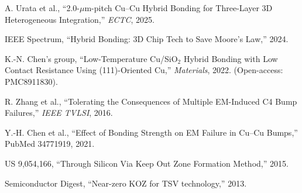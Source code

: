 \documentclass[conference]{IEEEtran}
\begin{document}
\begin{thebibliography}{99}
A. Urata et al., ``2.0-$\mu$m-pitch Cu--Cu Hybrid Bonding for Three-Layer 3D Heterogeneous Integration,'' \emph{ECTC}, 2025.

IEEE Spectrum, ``Hybrid Bonding: 3D Chip Tech to Save Moore’s Law,'' 2024.

K.-N. Chen’s group, ``Low-Temperature Cu/SiO$_2$ Hybrid Bonding with Low Contact Resistance Using (111)-Oriented Cu,'' \emph{Materials}, 2022. (Open-access: PMC8911830).

R. Zhang et al., ``Tolerating the Consequences of Multiple EM-Induced C4 Bump Failures,'' \emph{IEEE TVLSI}, 2016.

Y.-H. Chen et al., ``Effect of Bonding Strength on EM Failure in Cu–Cu Bumps,'' PubMed 34771919, 2021.

US 9,054,166, ``Through Silicon Via Keep Out Zone Formation Method,'' 2015.

Semiconductor Digest, ``Near-zero KOZ for TSV technology,'' 2013.

\end{thebibliography}
\end{document}
